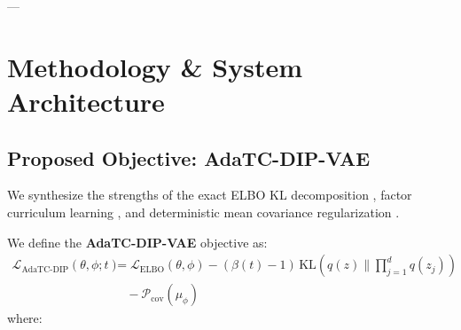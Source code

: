 \documentclass[10pt,journal,compsoc]{IEEEtran}
\begin{document}
---

\section{Methodology \& System Architecture}

\subsection{Proposed Objective: AdaTC-DIP-VAE}
We synthesize the strengths of the exact ELBO KL decomposition \cite{chen2018isolating}, factor curriculum learning \cite{burgess2018understanding}, and deterministic mean covariance regularization \cite{kumar2018variational}.

We define the \textbf{AdaTC-DIP-VAE} objective as:
\begin{equation}
\begin{aligned}
\mathcal{L}_{\text{AdaTC-DIP}}(\theta, \phi; t) &= \mathcal{L}_{\text{ELBO}}(\theta, \phi) - (\beta(t) - 1) \, \text{KL}\left(q(z) \parallel \prod_{j=1}^d q(z_j)\right) \\
&\quad - \mathcal{P}_{\text{cov}}(\mu_\phi)
\end{aligned}
\label{eq:proposed_obj}
\end{equation}
where:
\end{document}
